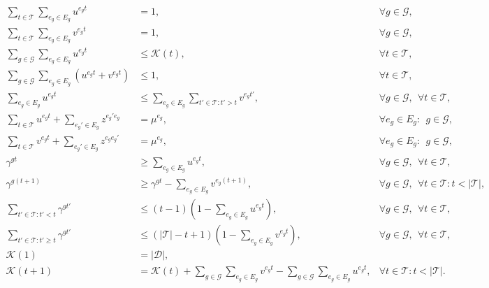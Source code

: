 \documentclass[10pt,a4paper]{elsarticle}
\begin{document}
\begin{align}
\sum_{t \in \mathcal T} \sum_{e_g\in E_g} u^{e_g t} &= 1, &\forall g \in \mathcal{G}, \label{eq:drone1}\\ 
\sum_{t \in \mathcal T} \sum_{e_g\in E_g} v^{e_g t} &= 1, &\forall g \in \mathcal{G}, \label{eq:drone2}\\
\sum_{g\in\mathcal {G}} \sum_{e_g \in E_g} u^{e_g t} &\leq \mathcal{K}(t), &\forall t \in \mathcal T, \label{eq:drone3}\\
\sum_{g\in\mathcal {G}} \sum_{e_g \in E_g} (u^{e_g t} + v^{e_g t}) &\leq 1, &\forall t \in \mathcal T, \label{eq:drone4}\\
\sum_{e_g \in E_g} u^{e_g t} &\leq \sum_{e_g \in E_g} \sum_{t' \in \mathcal T: t'>t} v^{e_g t'}, &\forall g\in\mathcal G, \:\: \forall t \in \mathcal T, \label{eq:drone5}\\
\sum_{t \in \mathcal T} u^{e_g t} + \sum_{e_g' \in E_g}z^{e_g'e_g} &= \mu^{e_g}, &\forall e_g \in E_g: \:\:  g \in \mathcal{G}, \label{eq:drone6}\\
\sum_{t \in \mathcal T} v^{e_g t} + \sum_{e_g' \in E_g}z^{e_g e_g'} &= \mu^{e_g}, &\forall e_g \in E_g: \:\: g \in \mathcal{G}, \label{eq:drone7}\\
\gamma^{gt} &\geq \sum_{e_g \in E_g} u^{e_g t}, &\forall g \in \mathcal{G}, \:\: \forall t \in \mathcal T, \label{eq:drone8}\\
\gamma^{g(t+1)} &\geq \gamma^{gt} - \sum_{e_g \in E_g} v^{e_g (t+1)},  &\forall g \in \mathcal{G}, \:\: \forall t \in \mathcal T: t < |\mathcal T|, \label{eq:drone9}\\
\sum_{t'\in\mathcal T : t' < t} \gamma^{gt'} &\leq (t-1)(1- \sum_{e_g\in E_g} u^{e_g t}), &\forall g\in\mathcal G, \:\: \forall t \in \mathcal T, \label{eq:drone10}\\
\sum_{t' \in \mathcal T: t' \geq t} \gamma^{gt'} &\leq \left(|\mathcal T| - t + 1\right) (1- \sum_{e_g\in E_g}v^{e_g t}), &\forall g\in\mathcal G, \:\: \forall t \in \mathcal T, \label{eq:drone11}\\
\mathcal{K}(1) &= |\mathcal{D}|, \label{eq:drone12}\\
\mathcal{K}(t+1) &= \mathcal{K}(t) + \sum_{g\in\mathcal {G}} \sum_{e_g \in E_g} v^{e_g t} - \sum_{g\in\mathcal G}\sum_{e_g \in E_g} u^{e_g t}, &\forall t \in \mathcal T: t<|\mathcal T|. \label{eq:drone13}
\end{align}
\end{document}
